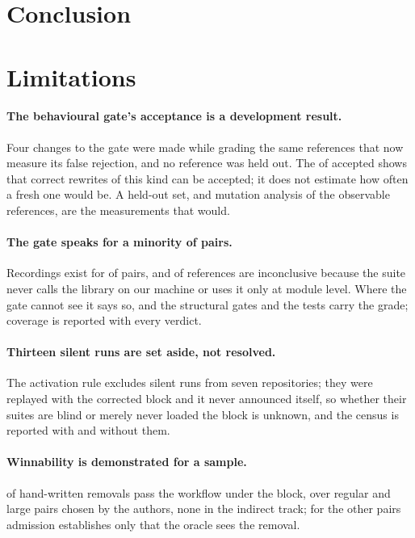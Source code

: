 \documentclass[11pt]{article}
\newif\ifdraft
\newcommand{\todo}[1]{\ifdraft\textcolor{red}{\textbf{[TODO: #1]}}\fi}
\begin{document}
\section{Conclusion}
\todo{Conclusion, to be written after the pending results land.}

\section*{Limitations}
\label{sec:limitations}

\paragraph{The behavioural gate's acceptance is a development result.}
Four changes to the gate were made while grading the same \nRefs{} references that now measure its false rejection, and no reference was held out.
The \nRefsAccepted{} of \nRefsAccepted{} accepted shows that correct rewrites of this kind can be accepted; it does not estimate how often a fresh one would be.
A held-out set, and mutation analysis of the observable references, are the measurements that would.

\paragraph{The gate speaks for a minority of pairs.}
Recordings exist for \nTracedPairs{} of \nPairs{} pairs, and \nRefsInconclusive{} of \nRefsEvaluable{} references are inconclusive because the suite never calls the library on our machine or uses it only at module level.
Where the gate cannot see it says so, and the structural gates and the tests carry the grade; coverage is reported with every verdict.

\paragraph{Thirteen silent runs are set aside, not resolved.}
The activation rule excludes \nExclInconclusive{} silent runs from seven repositories; they were replayed with the corrected block and it never announced itself, so whether their suites are blind or merely never loaded the block is unknown, and the census is reported with and without them.

\paragraph{Winnability is demonstrated for a sample.}
\nRefsPass{} of \nRefs{} hand-written removals pass the workflow under the block, over \nRefsRegular{} regular and \nRefsLarge{} large pairs chosen by the authors, none in the indirect track; for the other pairs admission establishes only that the oracle sees the removal.
\end{document}

